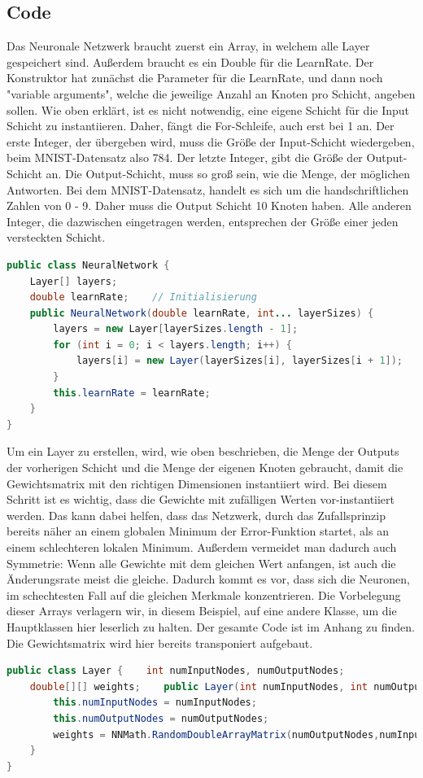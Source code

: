 \documentclass[12pt]{article}
\begin{document}
\subsection{Code}
Das Neuronale Netzwerk braucht zuerst ein Array, in welchem alle Layer gespeichert sind. Außerdem braucht es ein Double für die LearnRate. Der Konstruktor hat zunächst die Parameter für die LearnRate, und dann noch "variable arguments", welche die jeweilige Anzahl an Knoten pro Schicht, angeben sollen. Wie oben erklärt, ist es nicht notwendig, eine eigene Schicht für die Input Schicht zu instantiieren. Daher, fängt die For-Schleife, auch erst bei 1 an. Der erste Integer, der übergeben wird, muss die Größe der Input-Schicht wiedergeben, beim MNIST-Datensatz also 784. Der letzte Integer, gibt die Größe der Output-Schicht an. Die Output-Schicht, muss so groß sein, wie die Menge, der möglichen Antworten. Bei dem MNIST-Datensatz, handelt es sich um die handschriftlichen Zahlen von 0 - 9. Daher muss die Output Schicht 10 Knoten haben. Alle anderen Integer, die dazwischen eingetragen werden, entsprechen der Größe einer jeden versteckten Schicht.
\begin{lstlisting}[language=Java]
public class NeuralNetwork {
    Layer[] layers;
    double learnRate;    // Initialisierung
    public NeuralNetwork(double learnRate, int... layerSizes) {
        layers = new Layer[layerSizes.length - 1];
        for (int i = 0; i < layers.length; i++) {
            layers[i] = new Layer(layerSizes[i], layerSizes[i + 1]);
        }
        this.learnRate = learnRate;
    }
}
\end{lstlisting}
Um ein Layer zu erstellen, wird, wie oben beschrieben, die Menge der Outputs der vorherigen Schicht und die Menge der eigenen Knoten gebraucht, damit die Gewichtsmatrix mit den richtigen Dimensionen instantiiert wird. Bei diesem Schritt ist es wichtig, dass die Gewichte mit zufälligen Werten vor-instantiiert werden. Das kann dabei helfen, dass das Netzwerk, durch das Zufallsprinzip bereits näher an einem globalen Minimum der Error-Funktion startet, als an einem schlechteren lokalen Minimum. Außerdem vermeidet man dadurch auch Symmetrie: Wenn alle Gewichte mit dem gleichen Wert anfangen, ist auch die Änderungsrate meist die gleiche. Dadurch kommt es vor, dass sich die Neuronen, im schechtesten Fall auf die gleichen Merkmale konzentrieren. Die Vorbelegung dieser Arrays verlagern wir, in diesem Beispiel, auf eine andere Klasse, um die Hauptklassen hier leserlich zu halten. Der gesamte Code ist im Anhang zu finden. Die Gewichtsmatrix wird hier bereits transponiert aufgebaut.\begin{lstlisting}[language=Java]
public class Layer {    int numInputNodes, numOutputNodes;
    double[][] weights;    public Layer(int numInputNodes, int numOutputNodes) {
        this.numInputNodes = numInputNodes;
        this.numOutputNodes = numOutputNodes;
        weights = NNMath.RandomDoubleArrayMatrix(numOutputNodes,numInputNodes);
    }
}
\end{lstlisting}
\end{document}

